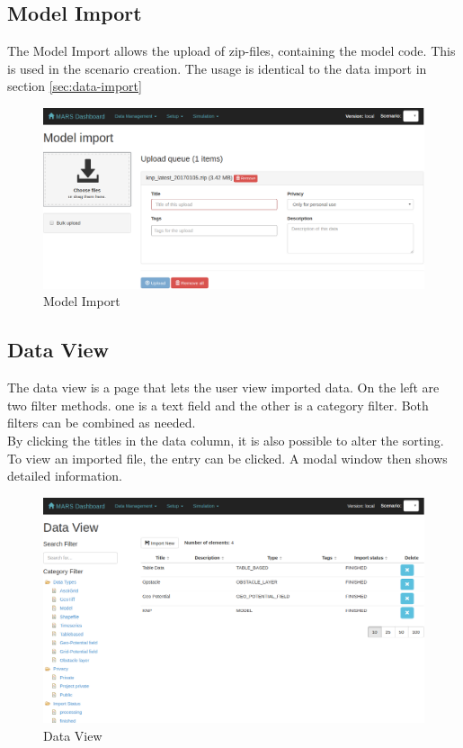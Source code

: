 \subsection{Model Import}
The Model Import allows the upload of zip-files, containing the model code. This is used in the scenario creation. The usage is identical to the data import in section \ref{sec:data-import}
\begin{figure}[H]
	\centering\includegraphics[width=1\textwidth]{res/workflow_model-import}
	\caption{Model Import}
	\label{fig:model-import-ui}
\end{figure}


\subsection{Data View}
The data view is a page that lets the user view imported data. On the left are two filter methods. one is a text field and the other is a category filter. Both filters can be combined as needed.\\
By clicking the titles in the data column, it is also possible to alter the sorting. To view an imported file, the entry can be clicked. A modal window then shows detailed information.
\begin{figure}[H]
	\centering\includegraphics[width=1\textwidth]{res/workflow_data-view}
	\caption{Data View}
	\label{fig:data-view-ui}
\end{figure}


